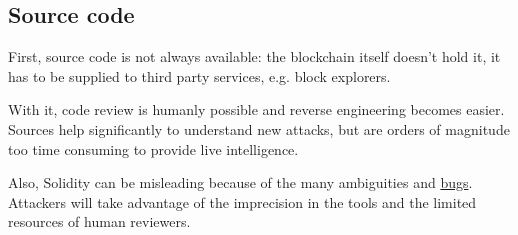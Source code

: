 \subsection{Source code}

First, source code is not always available: the blockchain itself doesn't hold it, it has to be supplied to third party services, e.g. block explorers.

With it, code review is humanly possible and reverse engineering becomes easier.
Sources help significantly to understand new attacks, but are orders of magnitude too time consuming to provide live intelligence.

Also, Solidity can be misleading because of the many ambiguities and \href{\urldocssoliditybugs}{bugs}.
Attackers will take advantage of the imprecision in the tools and the limited resources of human reviewers.
